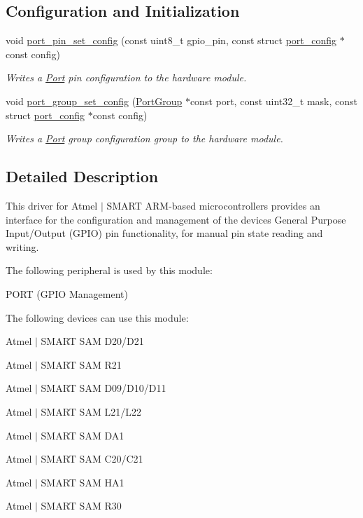 \subsection*{Configuration and Initialization}
\begin{DoxyCompactItemize}
\item 
void \mbox{\hyperlink{group__asfdoc__sam0__port__group_gad21f235037f2d75ee3e7c08ba8b239c5}{port\+\_\+pin\+\_\+set\+\_\+config}} (const uint8\+\_\+t gpio\+\_\+pin, const struct \mbox{\hyperlink{structport__config}{port\+\_\+config}} $\ast$const config)
\begin{DoxyCompactList}\small\item\em Writes a \mbox{\hyperlink{struct_port}{Port}} pin configuration to the hardware module. \end{DoxyCompactList}\item 
void \mbox{\hyperlink{group__asfdoc__sam0__port__group_ga7b832928bee6911ac7c9f18df8a5cf4a}{port\+\_\+group\+\_\+set\+\_\+config}} (\mbox{\hyperlink{struct_port_group}{Port\+Group}} $\ast$const port, const uint32\+\_\+t mask, const struct \mbox{\hyperlink{structport__config}{port\+\_\+config}} $\ast$const config)
\begin{DoxyCompactList}\small\item\em Writes a \mbox{\hyperlink{struct_port}{Port}} group configuration group to the hardware module. \end{DoxyCompactList}\end{DoxyCompactItemize}


\subsection{Detailed Description}
This driver for Atmel\textregistered{} $\vert$ S\+M\+A\+RT A\+RM\textregistered{}-\/based microcontrollers provides an interface for the configuration and management of the device\textquotesingle{}s General Purpose Input/\+Output (G\+P\+IO) pin functionality, for manual pin state reading and writing.

The following peripheral is used by this module\+:
\begin{DoxyItemize}
\item P\+O\+RT (G\+P\+IO Management)
\end{DoxyItemize}

The following devices can use this module\+:
\begin{DoxyItemize}
\item Atmel $\vert$ S\+M\+A\+RT S\+AM D20/\+D21
\item Atmel $\vert$ S\+M\+A\+RT S\+AM R21
\item Atmel $\vert$ S\+M\+A\+RT S\+AM D09/\+D10/\+D11
\item Atmel $\vert$ S\+M\+A\+RT S\+AM L21/\+L22
\item Atmel $\vert$ S\+M\+A\+RT S\+AM D\+A1
\item Atmel $\vert$ S\+M\+A\+RT S\+AM C20/\+C21
\item Atmel $\vert$ S\+M\+A\+RT S\+AM H\+A1
\item Atmel $\vert$ S\+M\+A\+RT S\+AM R30
\end{DoxyItemize}

